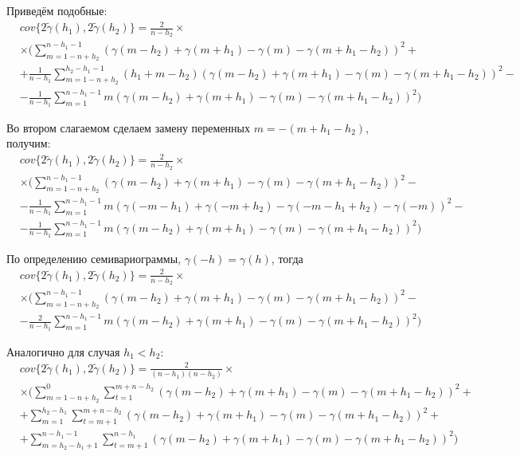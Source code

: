 Приведём подобные:
\begin{eqnarray*}
\nonumber
	& cov\{ 2 \tilde{\gamma}(h_1), 2 \tilde{\gamma}(h_2) \} = \frac{2}{n - h_2} \times \\
	& \times (\sum_{m = 1 - n + h_2}^{n - h_1 - 1} (\gamma(m - h_2) + \gamma(m + h_1) - \gamma(m) - \gamma(m + h_1 - h_2))^2 + \\
	& + \frac{1}{n - h_1} \sum_{m = 1 - n + h_2}^{h_2 - h_1 - 1} (h_1 + m - h_2)(\gamma(m - h_2) + \gamma(m + h_1) - \gamma(m) - \gamma(m + h_1 - h_2))^2 - \\
	& - \frac{1}{n - h_1} \sum_{m = 1}^{n - h_1 - 1} m (\gamma(m - h_2) + \gamma(m + h_1) - \gamma(m) - \gamma(m + h_1 - h_2))^2)
\end{eqnarray*}

Во втором слагаемом сделаем замену переменных $ m = -(m + h_1 - h_2) $, получим:
\begin{eqnarray*}
\nonumber
	& cov\{ 2 \tilde{\gamma}(h_1), 2 \tilde{\gamma}(h_2) \} = \frac{2}{n - h_2} \times \\
	& \times (\sum_{m = 1 - n + h_2}^{n - h_1 - 1} (\gamma(m - h_2) + \gamma(m + h_1) - \gamma(m) - \gamma(m + h_1 - h_2))^2 - \\
	& - \frac{1}{n - h_1} \sum_{m = 1}^{n - h_1 - 1} m (\gamma(-m - h_1) + \gamma(-m + h_2) - \gamma(-m - h_1 + h_2) - \gamma(-m))^2 - \\
	& - \frac{1}{n - h_1} \sum_{m = 1}^{n - h_1 - 1} m (\gamma(m - h_2) + \gamma(m + h_1) - \gamma(m) - \gamma(m + h_1 - h_2))^2)
\end{eqnarray*}

По определению семивариограммы, $ \gamma(-h) = \gamma(h) $, тогда
\begin{eqnarray*}
\nonumber
	& cov\{ 2 \tilde{\gamma}(h_1), 2 \tilde{\gamma}(h_2) \} = \frac{2}{n - h_2} \times \\
	& \times (\sum_{m = 1 - n + h_2}^{n - h_1 - 1} (\gamma(m - h_2) + \gamma(m + h_1) - \gamma(m) - \gamma(m + h_1 - h_2))^2 - \\
	& - \frac{2}{n - h_1} \sum_{m = 1}^{n - h_1 - 1} m (\gamma(m - h_2) + \gamma(m + h_1) - \gamma(m) - \gamma(m + h_1 - h_2))^2)
\end{eqnarray*}

Аналогично для случая $h_1 < h_2$:
\begin{eqnarray*}
\nonumber
	& cov\{ 2 \tilde{\gamma}(h_1), 2 \tilde{\gamma}(h_2) \} = \frac{2}{(n - h_1) (n - h_2)} \times \\
	& \times (\sum_{m = 1 - n + h_2}^{0}\sum_{t = 1}^{m + n - h_2}(\gamma(m - h_2) + \gamma(m + h_1) - \gamma(m) - \gamma(m + h_1 - h_2))^2 + \\
	& + \sum_{m = 1}^{h_2 - h_1}\sum_{t = m + 1}^{m + n - h_2}(\gamma(m - h_2) + \gamma(m + h_1) - \gamma(m) - \gamma(m + h_1 - h_2))^2 + \\
	& + \sum_{m = h_2 - h_1 + 1}^{n - h_1 - 1}\sum_{t = m + 1}^{n - h_1}(\gamma(m - h_2) + \gamma(m + h_1) - \gamma(m) - \gamma(m + h_1 - h_2))^2)
\end{eqnarray*}

